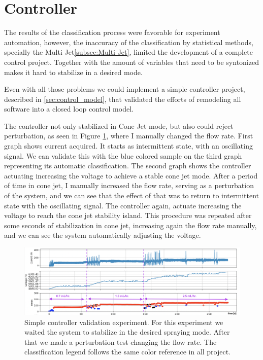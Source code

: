 \section{Controller}
\label{sec:controller_results}

    The results of the classification process were favorable for experiment automation, however, the inaccuracy of the classification by statistical methods, specially the Multi Jet\ref{subsec:Multi Jet}, limited the development of a complete control project.
    Together with the amount of variables that need to be syntonized makes it hard to stabilize in a desired mode.

    Even with all those problems we could implement a simple controller project, described in \ref{sec:control_model}, that validated the efforts of remodeling all software into a closed loop control model.
    
    The controller not only stabilized in Cone Jet mode, but also could reject perturbation, as seen in Figure \ref{fig:control_results}, where I manually changed the flow rate.
    First graph shows current acquired. It starts as intermittent state, with an oscillating signal. We can validate this with the blue colored sample on the third graph representing its automatic classification. 
    The second graph shows the controller actuating increasing the voltage to achieve a stable cone jet mode.
    After a period of time in cone jet, I manually increased the flow rate, serving as a perturbation of the system, and we can see that the effect of that was to return to intermittent state with the oscillating signal. The controller again, actuate increasing the voltage to reach the cone jet stability island. 
    This procedure was repeated after some seconds of stabilization in cone jet, increasing again the flow rate manually, and we can see the system automatically adjusting the voltage.
        \begin{figure}[H]
            \center
            \includegraphics[width=16cm]{Figuras/19:03/control_first_results.png}
            \caption{Simple controller validation experiment. For this experiment we waited the system to stabilize in the desired spraying mode. After that we made a perturbation test changing the flow rate. The classification legend follows the same color reference in all project.}
            \label{fig:control_results}
        \end{figure}

